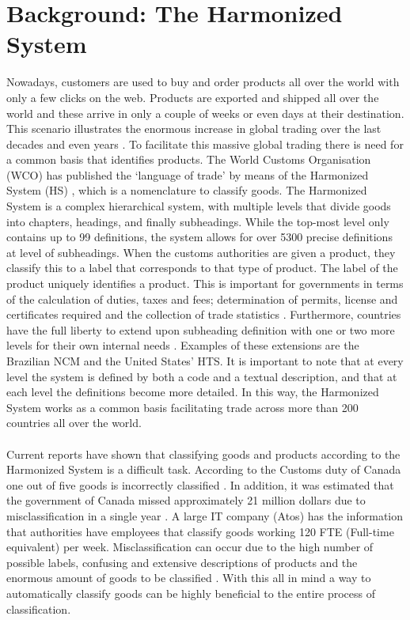\newpage
\section{Background: The Harmonized System}
Nowadays, customers are used to buy and order products all over the world with only a few clicks on the web. Products are exported and shipped all over the world and these arrive in only a couple of weeks or even days at their destination. This scenario illustrates the enormous increase in global trading over the last decades \cite{EstebanOrtiz-Ospina2018} and even years \cite{World-Trade-Statistical-2018}. To facilitate this massive global trading there is need for a common basis that identifies products. The World Customs Organisation (WCO) has published the ‘language of trade’ by means of the Harmonized System (HS) \cite{GeneralSecretariatoftheWorldCustomsOrganisationWCO1983, Chan2015} , which is a nomenclature to classify goods. The Harmonized System is a complex hierarchical system, with multiple levels that divide goods into chapters, headings, and finally subheadings. While the top-most level only contains up to 99 definitions, the system allows for over 5300 precise definitions at level of subheadings. When the customs authorities are given a product, they classify this to a label that corresponds to that type of product. The label of the product uniquely identifies a product. This is important for governments in terms of the calculation of duties, taxes and fees; determination of permits, license and certificates required and the collection of trade statistics \cite{Ding2015}. Furthermore, countries have the full liberty to extend upon subheading definition with one or two more levels for their own internal needs \cite{Weerth2008}. Examples of these extensions are the Brazilian NCM and the United States’ HTS. It is important to note that at every level the system is defined by both a code and a textual description, and that at each level the definitions become more detailed. In this way, the Harmonized System works as a common basis facilitating trade across more than 200 countries all over the world.\\
\\
Current reports have shown that classifying goods and products according to the Harmonized System is a difficult task. According to the Customs duty of Canada one out of five goods is incorrectly classified \cite{AuditorGeneralofCanada2017}. In addition, it was estimated that the government of Canada missed approximately 21 million dollars due to misclassification in a single year \cite{AuditorGeneralofCanada2017}. A large IT company (Atos) has the information that authorities have employees that classify goods working 120 FTE (Full-time equivalent) per week. Misclassification can occur due to the high number of possible labels, confusing and extensive descriptions of products and the enormous amount of goods to be classified \cite{Kappler2011a}. With this all in mind a way to automatically classify goods can be highly beneficial to the entire process of classification.\\
